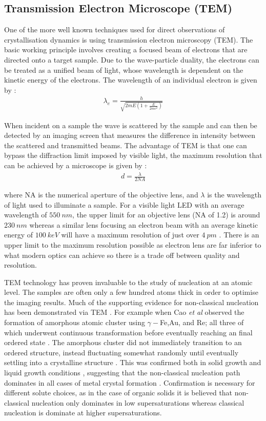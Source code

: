 \subsection{Transmission Electron Microscope (TEM)}
One of the more well known techniques used for direct observations 
of crystallisation dynamics is using transmission electron 
microscopy (TEM). The basic working principle involves creating a 
focused beam of electrons that are directed onto a target sample.
Due to the wave-particle duality, the electrons can be treated 
as a unified beam of light, whose wavelength is dependent on the 
kinetic energy of the electrons. The wavelength of an individual 
electron is given by \cite{Williams2009}:
\begin{align}
	\lambda_e = \frac{h}{\sqrt{2mE(1+\frac{E}{2mc^2})}}
\end{align}

\noindent
When incident on a sample the wave is scattered by the sample 
and can then be detected by an imaging screen that measures 
the difference in intensity between the scattered and 
transmitted beams. The advantage of TEM is that one can bypass
the diffraction limit imposed by visible light, the maximum 
resolution that can be achieved by a microscope is given by
\cite{Champness2020}:
\begin{align}
	d = \frac{\lambda}{2NA}
\end{align} 

\noindent
where NA is the numerical aperture of the objective lens, and
$\lambda$ is the wavelength of light used to illuminate a sample.
For a visible light LED with an average wavelength of $550~nm$, 
the upper limit for an objective lens (NA of 1.2) is around 
$230~nm$ whereas a similar lens focusing an electron beam 
with an average kinetic energy of $100~keV$ will have a maximum 
resolution of just over $4~pm$ \cite{Champness2020}. There is
an upper limit to the maximum resolution possible as electron 
lens are far inferior to what modern optics can achieve 
\cite{Champness2020} so there is a trade off between quality and 
resolution. 

TEM technology has proven invaluable to the study of nucleation
at an atomic level. The samples are often only a few hundred 
atoms thick in order to optimise the imaging results. Much of 
the supporting evidence for non-classical nucleation has been 
demonstrated via TEM \cite{Ye2023}. For example when Cao 
\textit{et al} observed the formation of amorphous atomic 
cluster using $\gamma-$Fe,Au, and Re; all three of which 
underwent continuous transformation before eventually 
reaching an final ordered state \cite{Cao2020}. The amorphous 
cluster did not immediately transition to an ordered structure, 
instead fluctuating somewhat randomly until eventually settling 
into a crystalline structure \cite{Cao2020}. This was confirmed 
both in solid growth and liquid growth conditions \cite{Cao2020, 
Loh2016}, suggesting that the non-classical nucleation path 
dominates in all cases of metal crystal formation \cite{Ye2023}. 
Confirmation is necessary for different solute choices, as in 
the case of organic solids it is believed that non-classical 
nucleation only dominates in low supersaturations whereas 
classical nucleation is dominate at higher supersaturations.

